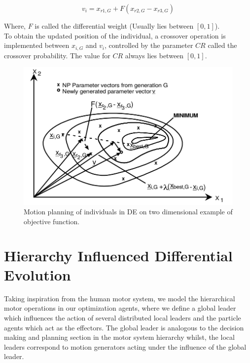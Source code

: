 \documentclass[a4paper,twoside]{article}
\begin{document}
\begin{equation}
\label{de}
v_i = x_{r1,G} + F (x_{r2,G} - x_{r3,G})
\end{equation}

Where, $F$ is called the differential weight (Usually lies between $[0, 1]$).\\
To obtain the updated position of the individual, a crossover operation is implemented between $x_{i,G}$ and $v_i$, controlled by the parameter $CR$ called the crossover probability. The value for $CR$ always lies between $[0, 1]$.

\begin{figure}[h!]
  \includegraphics[scale=0.3]{contourDE}
 \caption{Motion planning of individuals in DE on two dimensional example of objective function.}

  \label{fig:contourDE}
\end{figure}


\section{Hierarchy Influenced Differential Evolution}

Taking inspiration from the human motor system, we model the hierarchical motor operations in our optimization agents, where we define a global leader which influences the action of several distributed local leaders and the particle agents which act as the effectors. The global leader is analogous to the decision making and planning section in the motor system hierarchy whilst, the local leaders correspond to motion generators acting under the influence of the  global leader.
\end{document}
